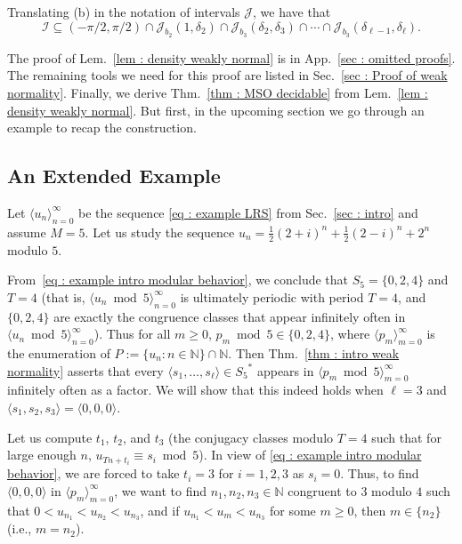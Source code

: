 \documentclass[a4paper,UKenglish,cleveref, autoref, thm-restate]{lipics-v2021}
\newcommand{\nat} {\mathbb{N}}
\begin{document}
Translating (b) in the notation of intervals $\mathcal{J}$, we have that
$$
\mathcal{I} \subseteq (-\pi/2,\pi/2) \cap \mathcal{J}_{b_2}(1, \delta_2) \cap \mathcal{J}_{b_3}(\delta_2, \delta_3)\cap \cdots \cap \mathcal{J}_{b_3}(\delta_{\ell-1}, \delta_\ell).
$$


The proof of Lem.~\ref{lem : density weakly normal} is in App.~\ref{sec : omitted proofs}.
The remaining tools we need for this proof are listed in Sec.~\ref{sec
  : Proof of weak normality}.
Finally, we derive Thm.~\ref{thm : MSO decidable} from Lem.~\ref{lem : density weakly normal}.
But first, in the upcoming section we go through an example to recap the construction.

\subsection{An Extended Example}\label{sec : example}

Let $\langle u_n\rangle_{n=0}^\infty$ be the sequence \eqref{eq :
  example LRS} from Sec.~\ref{sec : intro} and assume $M = 5$.
Let us study the sequence $u_n = \frac{1}{2}(2+i)^n + \frac{1}{2}(2-i)^n + 2^n$ modulo $5$.

From~\eqref{eq : example intro modular behavior}, we conclude that
$S_5 = \{0,2,4\}$ and $T = 4$ (that is, $\langle u_n \bmod 5\rangle_{n=0}^\infty$ is ultimately periodic with period $T=4$, and $\{0, 2, 4\}$ are exactly the congruence classes that appear infinitely often in $\langle u_n \bmod 5\rangle_{n=0}^\infty$).
Thus for all $m \ge 0$, $p_m\bmod 5 \in \{0,2,4\}$, where $\langle p_m\rangle_{m=0}^\infty$ is the enumeration of $P := \{u_n \colon n \in \nat\} \cap \nat$.
Then Thm.~\ref{thm : intro weak normality} asserts that every
$\langle s_1,\dots,s_\ell\rangle \in {S_5}^*$ appears in
$\langle p_m \bmod 5\rangle_{m=0}^\infty$ infinitely often as a factor. 
We will show that this indeed holds when $\ell = 3$ and $\langle s_1,s_2,s_3 \rangle = \langle 0,0,0 \rangle$.

Let us compute $t_1$, $t_2$, and $t_3$ (the conjugacy classes modulo $T = 4$ such that for large enough $n$, $u_{Tn + t_i} \equiv s_i \bmod 5$). 
In view of \eqref{eq : example intro modular behavior}, we are forced to take $t_i = 3$ for $i = 1,2,3$ as $s_i = 0$.
Thus, to find $\langle0,0,0\rangle$ in $\langle
p_m\rangle_{m=0}^\infty$, we want to find $n_1,n_2,n_3 \in \nat$
congruent to $3$ modulo $4$ such that $0 < u_{n_1} < u_{n_2} <
u_{n_3}$, and if $u_{n_1} < u_m < u_{n_3}$ for some $m \ge 0$, then
$m \in \{n_2\}$ (i.e., $m = n_2$).
\end{document}
